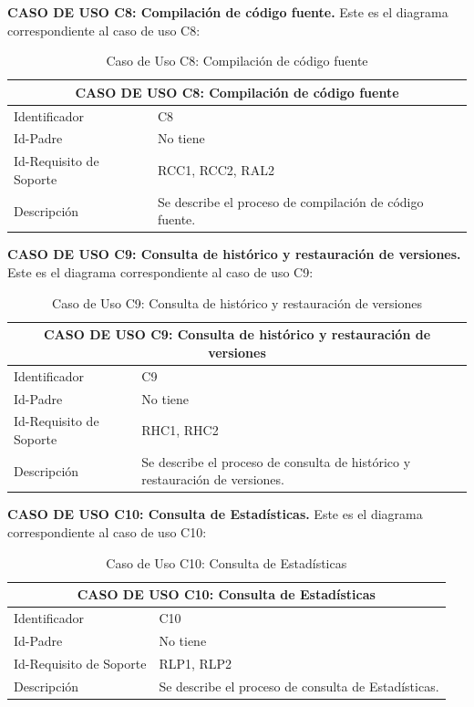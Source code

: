 \vspace{2cm}

\textbf{CASO DE USO C8: Compilación de código fuente.} Este es el diagrama correspondiente al caso de uso C8:

\begin{table}[h]
\centering
\begin{tabular}{ | p{} | p{} | }
	\hline
	\multicolumn{2}{|c|}{CASO DE USO C8: Compilación de código fuente} \\
	\hline
	Identificador  & C8 \\
	\hline 
	Id-Padre & No tiene \\
	\hline
	Id-Requisito de Soporte & RCC1, RCC2, RAL2 \\
	\hline
	Descripción & Se describe el proceso de compilación de código fuente. \\
	\hline
\end{tabular}
\caption{Caso de Uso C8: Compilación de código fuente}
\end{table}

\newpage

\textbf{CASO DE USO C9: Consulta de histórico y restauración de versiones.} Este es el diagrama correspondiente al caso de uso C9:

\begin{table}[h]
\centering
\begin{tabular}{ | p{} | p{} | }
	\hline
	\multicolumn{2}{|c|}{CASO DE USO C9: Consulta de histórico y restauración de versiones} \\
	\hline
	Identificador  & C9 \\
	\hline 
	Id-Padre & No tiene \\
	\hline
	Id-Requisito de Soporte & RHC1, RHC2 \\
	\hline
	Descripción & Se describe el proceso de consulta de histórico y restauración de versiones. \\
	\hline
\end{tabular}
\caption{Caso de Uso C9: Consulta de histórico y restauración de versiones}
\end{table}

\vspace{2cm}

\textbf{CASO DE USO C10: Consulta de Estadísticas.} Este es el diagrama correspondiente al caso de uso C10:

\begin{table}[h]
\centering
\begin{tabular}{ | p{} | p{} | }
	\hline
	\multicolumn{2}{|c|}{CASO DE USO C10: Consulta de Estadísticas} \\
	\hline
	Identificador  & C10 \\
	\hline 
	Id-Padre & No tiene \\
	\hline
	Id-Requisito de Soporte & RLP1, RLP2 \\
	\hline
	Descripción & Se describe el proceso de consulta de Estadísticas. \\
	\hline
\end{tabular}
\caption{Caso de Uso C10: Consulta de Estadísticas}
\end{table}

